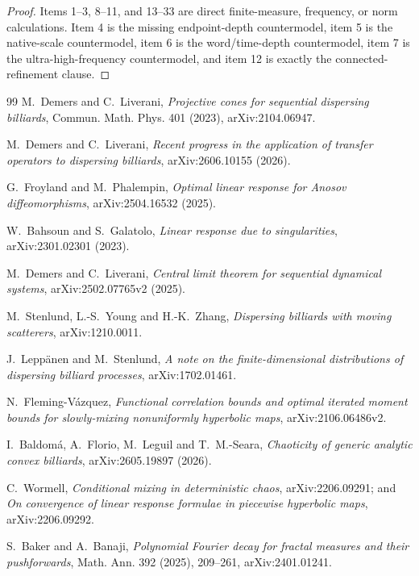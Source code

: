 \documentclass[11pt]{article}
\begin{document}
\begin{proof}
Items 1--3, 8--11, and 13--33 are direct finite-measure, frequency, or norm
calculations.  Item 4 is the missing endpoint-depth countermodel, item 5 is
the native-scale countermodel, item 6 is the word/time-depth countermodel,
item 7 is the ultra-high-frequency countermodel, and item 12 is exactly the
connected-refinement clause.
\end{proof}

\begingroup\raggedright
\begin{thebibliography}{99}
M.~Demers and C.~Liverani,
\emph{Projective cones for sequential dispersing billiards},
Commun. Math. Phys. 401 (2023), arXiv:2104.06947.

M.~Demers and C.~Liverani,
\emph{Recent progress in the application of transfer operators to dispersing
billiards}, arXiv:2606.10155 (2026).

G.~Froyland and M.~Phalempin,
\emph{Optimal linear response for Anosov diffeomorphisms},
arXiv:2504.16532 (2025).

W.~Bahsoun and S.~Galatolo,
\emph{Linear response due to singularities}, arXiv:2301.02301 (2023).

M.~Demers and C.~Liverani,
\emph{Central limit theorem for sequential dynamical systems},
arXiv:2502.07765v2 (2025).

M.~Stenlund, L.-S.~Young and H.-K.~Zhang,
\emph{Dispersing billiards with moving scatterers},
arXiv:1210.0011.

J.~Lepp\"anen and M.~Stenlund,
\emph{A note on the finite-dimensional distributions of dispersing billiard processes},
arXiv:1702.01461.

N.~Fleming-V\'azquez,
\emph{Functional correlation bounds and optimal iterated moment bounds for
slowly-mixing nonuniformly hyperbolic maps}, arXiv:2106.06486v2.

I.~Baldom\'a, A.~Florio, M.~Leguil and T.~M.-Seara,
\emph{Chaoticity of generic analytic convex billiards},
arXiv:2605.19897 (2026).

C.~Wormell,
\emph{Conditional mixing in deterministic chaos},
arXiv:2206.09291; and
\emph{On convergence of linear response formulae in piecewise hyperbolic maps},
arXiv:2206.09292.

S.~Baker and A.~Banaji,
\emph{Polynomial Fourier decay for fractal measures and their pushforwards},
Math. Ann. 392 (2025), 209--261, arXiv:2401.01241.


\end{thebibliography}
\end{document}
